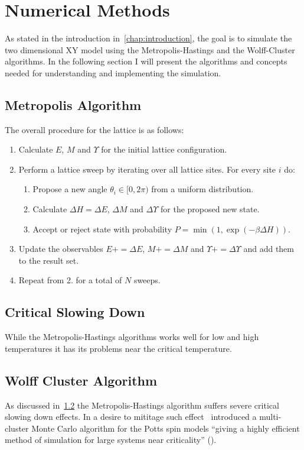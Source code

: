 \section{Numerical Methods}\label{sec:theo:numerical_methods}
	As stated in the introduction in~\cref{chap:introduction}, the goal is to simulate the two dimensional XY model using the Metropolis-Hastings and the Wolff-Cluster algorithms. In the following section I will present the algorithms and concepts needed for understanding and implementing the simulation.

	\subsection{Metropolis Algorithm}\label{sec:theo:metropolis}
		
	
		The overall procedure for the lattice is as follows:
		\begin{enumerate}
			\item Calculate $E$, $M$ and $\Upsilon$ for the initial lattice configuration.
			\item Perform a lattice sweep by iterating over all lattice sites. For every site $i$ do:
			\begin{enumerate}
				\item Propose a new angle $\theta_i \in [0,2\pi)$ from a uniform distribution.
				\item Calculate $\Delta H = \Delta E$, $\Delta M$ and $\Delta \Upsilon$ for the proposed new state.
				\item Accept or reject state with probability $P = \min{(1, \exp{(-\beta\Delta H)})}$.
			\end{enumerate}
			\item Update the observables $E \mathrel{{+}{=}} \Delta E$, $M \mathrel{{+}{=}} \Delta M$ and $\Upsilon \mathrel{{+}{=}} \Delta \Upsilon$ and add them to the result set.
			\item Repeat from 2. for a total of $N$ sweeps.
		\end{enumerate}
		
	\subsection{Critical Slowing Down}\label{sec:theo:critical_slowing_down}
		While the Metropolis-Hastings algorithms works well for low and high temperatures it has its problems near the critical temperature. 
		
	\subsection{Wolff Cluster Algorithm}\label{sec:theo:wolff_cluster}
		As discussed in~\cref{sec:theo:critical_slowing_down} the Metropolis-Hastings algorithm suffers severe critical slowing down effects. In a desire to mititage such effect~\cite{sw} introduced a multi-cluster Monte Carlo algorithm for the Potts spin models \enquote{giving a highly efficient method of simulation for large systems near criticality} (\cite{sw}).
		
